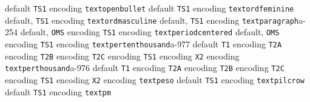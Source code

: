 \documentclass[twoside]{ltxdoc}
\makeatletter
\renewenvironment{theindex}{%
   \@restonecoltrue
   \if@twocolumn\@restonecolfalse\fi
   \columnseprule \z@
   \columnsep 35\p@
   \twocolumn[\index@prologue]%
   \IndexParms
   \let\item\@idxitem
   \ignorespaces
}{\if@restonecol\onecolumn\else\clearpage\fi}
\makeatother
\begin{document}
\begin{theindex}
    \subitem default\pfill {}
    \subitem \texttt  {TS1} encoding\pfill {}
  \item \texttt  {textopenbullet}\efill 
    \subitem default\pfill {}
    \subitem \texttt  {TS1} encoding\pfill {}
  \item \texttt  {textordfeminine}\efill 
    \subitem default\pfill {}, 
    \subitem \texttt  {TS1} encoding\pfill {}
  \item \texttt  {textordmasculine}\efill 
    \subitem default\pfill {}, 
    \subitem \texttt  {TS1} encoding\pfill {}
  \item \texttt  {textparagraph}\pfill a-254
    \subitem default\pfill {}, 
    \subitem \texttt  {OMS} encoding\pfill {}
    \subitem \texttt  {TS1} encoding\pfill {}
  \item \texttt  {textperiodcentered}\efill 
    \subitem default\pfill {}, 
    \subitem \texttt  {OMS} encoding\pfill {}
    \subitem \texttt  {TS1} encoding\pfill {}
  \item \texttt  {textpertenthousand}\pfill a-977
    \subitem default\pfill {}
    \subitem \texttt  {T1} encoding\pfill {}
    \subitem \texttt  {T2A} encoding\pfill {}
    \subitem \texttt  {T2B} encoding\pfill {}
    \subitem \texttt  {T2C} encoding\pfill {}
    \subitem \texttt  {TS1} encoding\pfill {}
    \subitem \texttt  {X2} encoding\pfill {}
  \item \texttt  {textperthousand}\pfill a-976
    \subitem default\pfill {}
    \subitem \texttt  {T1} encoding\pfill {}
    \subitem \texttt  {T2A} encoding\pfill {}
    \subitem \texttt  {T2B} encoding\pfill {}
    \subitem \texttt  {T2C} encoding\pfill {}
    \subitem \texttt  {TS1} encoding\pfill {}
    \subitem \texttt  {X2} encoding\pfill {}
  \item \texttt  {textpeso}\efill 
    \subitem default\pfill {}
    \subitem \texttt  {TS1} encoding\pfill {}
  \item \texttt  {textpilcrow}\efill 
    \subitem default\pfill {}
    \subitem \texttt  {TS1} encoding\pfill {}
  \item \texttt  {textpm}\efill 

\end{theindex}
\end{document}
